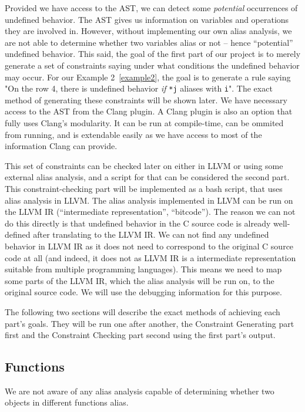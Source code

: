 Provided we have access to the AST, we can detect some \emph{potential} occurrences of undefined behavior. The AST gives us information on variables and operations they are involved in. However, without implementing our own alias analysis, we are not able to determine whether two variables alias or not -- hence ``potential'' undefined behavior. This said, the goal of the first part of our project is to merely generate a set of constraints saying under what conditions the undefined behavior may occur. For our Example 2~\ref{example2}, the goal is to generate a rule saying "On the row 4, there is undefined behavior \emph{if} \verb|*j| aliases with \verb|i|". The exact method of generating these constraints will be shown later. We have necessary access to the AST from the Clang plugin. A Clang plugin is also an option that fully uses Clang's modularity. It can be run at compile-time, can be ommited from running, and is extendable easily as we have access to most of the information Clang can provide.

This set of constraints can be checked later on either in LLVM or using some external alias analysis, and a script for that can be considered the second part. This constraint-checking part will be implemented as a bash script, that uses alias analysis in LLVM. The alias analysis implemented in LLVM can be run on the LLVM IR (``intermediate representation'', ``bitcode''). The reason we can not do this directly is that undefined behavior in the C source code is already well-defined after translating to the LLVM IR. We can not find any undefined behavior in LLVM IR as it does not need to correspond to the original C source code at all (and indeed, it does not as LLVM IR is a intermediate representation suitable from multiple programming languages). This means we need to map some parts of the LLVM IR, which the alias analysis will be run on, to the original source code. We will use the debugging information for this purpose.

The following two sections will describe the exact methods of achieving each part's goals. They will be run one after another, the Constraint Generating part first and the Constraint Checking part second using the first part's output.


\subsection{Functions}\label{functions}
We are not aware of any alias analysis capable of determining whether two objects in different functions alias.

